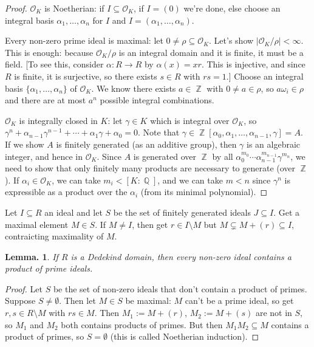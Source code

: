 \documentclass[11pt, a4paper]{memoir}
\DeclareMathOperator{\Q}{{\mathbb{Q}}}
\DeclareMathOperator{\Z}{{\mathbb{Z}}}
\theoremstyle{change}
\newtheorem{lemma}[theorem]{Lemma.}
\theoremstyle{plain}
\theoremstyle{nonumberplain}
\newtheorem{proof}{Proof}
\numberwithin{equation}{section}
\begin{document}
\begin{proof}
    $\mathcal{O}_K$ is Noetherian: if $I\subseteq\mathcal{O}_K$, if $I=(0)$ we're done, else choose an integral basis $\alpha_1,\ldots,\alpha_n$ for $I$ and $I=(\alpha_1,\ldots,\alpha_n)$.

    Every non-zero prime ideal is maximal: let $0\neq \rho\subseteq\mathcal{O}_K$.
    Let's show $|\mathcal{O}_K/\rho|<\infty$.
    This is enough: because $\mathcal{O}_K/\rho$ is an integral domain and it is finite, it must be a field.
    [To see this, consider $\alpha:R\to R$ by $\alpha(x)=xr$.
    This is injective, and since $R$ is finite, it is surjective, so there exists $s\in R$ with $rs=1$.]
    Choose an integral basis $\{\alpha_1,\ldots,\alpha_n\}$ of $\mathcal{O}_K$.
    We know there exists $a\in\Z$ with $0\neq a\in\rho$, so $a\omega_i\in\rho$ and there are at most $a^n$ possible integral combinations.

    $\mathcal{O}_K$ is integrally closed in $K$: let $\gamma\in K$ which is integral over $\mathcal{O}_K$, so $\gamma^n+\alpha_{n-1}\gamma^{n-1}+\cdots+\alpha_1\gamma+\alpha_0=0$.
    Note that $\gamma\in\Z[\alpha_0,\alpha_1,\ldots,\alpha_{n-1},\gamma]=A$.
    If we show $A$ is finitely generated (as an additive group), then $\gamma$ is an algebraic integer, and hence in $\mathcal{O}_K$.
    Since $A$ is generated over $\Z$ by all $\alpha_0^{m_0}\cdots\alpha_{n-1}^{m_{n-1}}\gamma^{m_n}$, we need to show that only finitely many products are necessary to generate (over $\Z$).
    If $\alpha_i\in\mathcal{O}_K$, we can take $m_i<[K:\Q]$, and we can take $m<n$ since $\gamma^n$ is expressible as a product over the $\alpha_i$ (from its minimal polynomial).
\end{proof}
Let $I\subseteq R$ an ideal and let $S$ be the set of finitely generated ideals $J\subseteq I$.
Get a maximal element $M\in S$.
If $M\neq I$, then get $r\in I\setminus M$ but $M\subsetneq M+(r)\subseteq I$, contraicting maximality of $M$.
\begin{lemma}
    If $R$ is a Dedekind domain, then every non-zero ideal contains a product of prime ideals.
\end{lemma}
\begin{proof}
    Let $S$ be the set of non-zero ideals that don't contain a product of primes.
    Suppose $S\neq\emptyset$.
    Then let $M\in S$ be maximal: $M$ can't be a prime ideal, so get $r,s\in R\setminus M$ with $rs\in M$.
    Then $M_1:=M+(r)$, $M_2:=M+(s)$ are not in $S$, so $M_1$ and $M_2$ both contains products of primes.
    But then $M_1M_2\subseteq M$ contains a product of primes, so $S=\emptyset$ (this is called Noetherian induction).
\end{proof}
\end{document}
